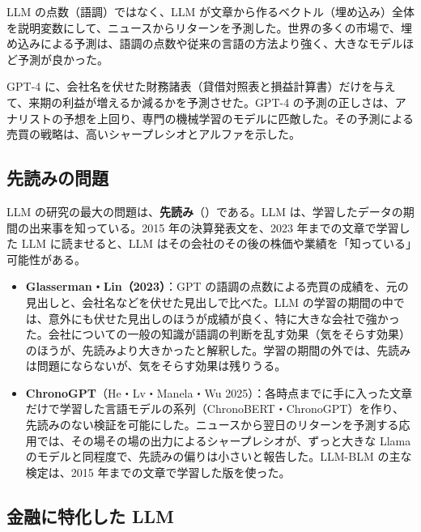 \begin{paperbox}
LLM の点数（語調）ではなく、LLM が文章から作るベクトル（埋め込み）全体を説明変数にして、ニュースからリターンを予測した。世界の多くの市場で、埋め込みによる予測は、語調の点数や従来の言語の方法より強く、大きなモデルほど予測が良かった。
\end{paperbox}

\begin{paperbox}
GPT-4 に、会社名を伏せた財務諸表（貸借対照表と損益計算書）だけを与えて、来期の利益が増えるか減るかを予測させた。GPT-4 の予測の正しさは、アナリストの予想を上回り、専門の機械学習のモデルに匹敵した。その予測による売買の戦略は、高いシャープレシオとアルファを示した。
\end{paperbox}

\subsection{先読みの問題}

LLM の研究の最大の問題は、\textbf{先読み}（）である。LLM は、学習したデータの期間の出来事を知っている。2015 年の決算発表文を、2023 年までの文章で学習した LLM に読ませると、LLM はその会社のその後の株価や業績を「知っている」可能性がある。

\begin{itemize}
\item \textbf{Glasserman・Lin（2023）}\cite{glasserman2023}：GPT の語調の点数による売買の成績を、元の見出しと、会社名などを伏せた見出しで比べた。LLM の学習の期間の中では、意外にも伏せた見出しのほうが成績が良く、特に大きな会社で強かった。会社についての一般の知識が語調の判断を乱す効果（気をそらす効果）のほうが、先読みより大きかったと解釈した。学習の期間の外では、先読みは問題にならないが、気をそらす効果は残りうる。
\item \textbf{ChronoGPT}（He・Lv・Manela・Wu 2025）\cite{chronogpt2025}：各時点までに手に入った文章だけで学習した言語モデルの系列（ChronoBERT・ChronoGPT）を作り、先読みのない検証を可能にした。ニュースから翌日のリターンを予測する応用では、その場その場の出力によるシャープレシオが、ずっと大きな Llama のモデルと同程度で、先読みの偏りは小さいと報告した。LLM-BLM の主な検定は、2015 年までの文章で学習した版を使った。
\end{itemize}

\subsection{金融に特化した LLM}

